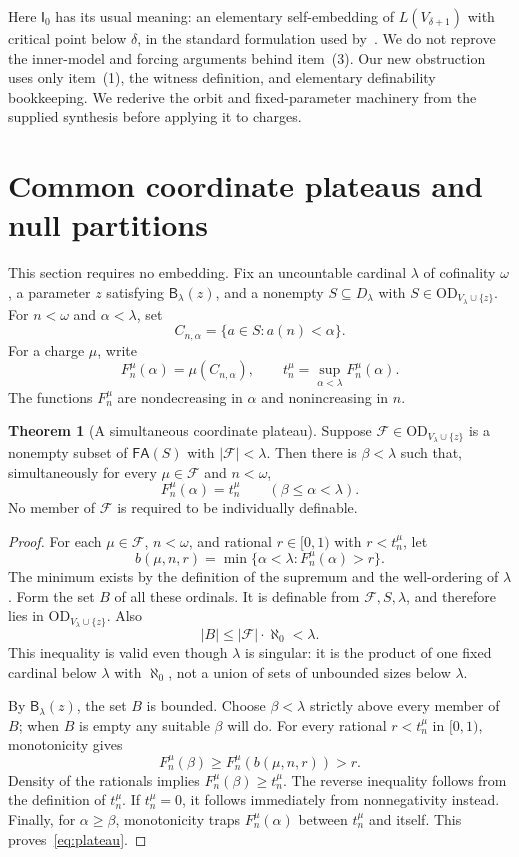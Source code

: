 \documentclass[11pt,letterpaper]{article}
\theoremstyle{definition}
\newtheorem{theorem}[definition]{Theorem}
\newcommand{\OD}{\mathrm{OD}}
\newcommand{\FA}{\mathsf{FA}}
\newcommand{\Izero}{\mathsf I_0}
\newcommand{\Blam}[1]{\mathsf B_\lambda(#1)}
\newcommand{\ODz}{\OD_{V_\lambda\cup\{z\}}}
\newcommand{\Dlam}{D_\lambda}
\begin{document}
Here $\Izero$ has its usual meaning: an elementary self-embedding of $L(V_{\delta+1})$ with critical point below $\delta$, in the standard formulation used by~\cite{abgl}. We do not reprove the inner-model and forcing arguments behind item~(3). Our new obstruction uses only item~(1), the witness definition, and elementary definability bookkeeping. We rederive the orbit and fixed-parameter machinery from the supplied synthesis before applying it to charges.

\section{Common coordinate plateaus and null partitions}\label{sec:null}

This section requires no embedding. Fix an uncountable cardinal $\lambda$ of cofinality $\omega$, a parameter $z$ satisfying $\Blam z$, and a nonempty $S\subseteq\Dlam$ with $S\in\ODz$. For $n<\omega$ and $\alpha<\lambda$, set
\[
 C_{n,\alpha}=\{a\in S:a(n)<\alpha\}.
\]
For a charge $\mu$, write
\[
 F_n^\mu(\alpha)=\mu(C_{n,\alpha}),
 \qquad t_n^\mu=\sup_{\alpha<\lambda}F_n^\mu(\alpha).
\]
The functions $F_n^\mu$ are nondecreasing in $\alpha$ and nonincreasing in $n$.

\begin{theorem}[A simultaneous coordinate plateau]\label{thm:plateau}
Suppose $\mathcal F\in\ODz$ is a nonempty subset of $\FA(S)$ with $|\mathcal F|<\lambda$. Then there is $\beta<\lambda$ such that, simultaneously for every $\mu\in\mathcal F$ and $n<\omega$,
\begin{equation}\label{eq:plateau}
 F_n^\mu(\alpha)=t_n^\mu\qquad(\beta\le\alpha<\lambda).
\end{equation}
No member of $\mathcal F$ is required to be individually definable.
\end{theorem}

\begin{proof}
For each $\mu\in\mathcal F$, $n<\omega$, and rational $r\in[0,1)$ with $r<t_n^\mu$, let
\[
 b(\mu,n,r)=\min\{\alpha<\lambda:F_n^\mu(\alpha)>r\}.
\]
The minimum exists by the definition of the supremum and the well-ordering of $\lambda$. Form the set $B$ of all these ordinals. It is definable from $\mathcal F,S,\lambda$, and therefore lies in $\ODz$. Also
\[
 |B|\le |\mathcal F|\cdot\aleph_0<\lambda.
\]
This inequality is valid even though $\lambda$ is singular: it is the product of one fixed cardinal below $\lambda$ with $\aleph_0$, not a union of sets of unbounded sizes below $\lambda$.

By $\Blam z$, the set $B$ is bounded. Choose $\beta<\lambda$ strictly above every member of $B$; when $B$ is empty any suitable $\beta$ will do. For every rational $r<t_n^\mu$ in $[0,1)$, monotonicity gives
\[
 F_n^\mu(\beta)\ge F_n^\mu(b(\mu,n,r))>r.
\]
Density of the rationals implies $F_n^\mu(\beta)\ge t_n^\mu$. The reverse inequality follows from the definition of $t_n^\mu$. If $t_n^\mu=0$, it follows immediately from nonnegativity instead. Finally, for $\alpha\ge\beta$, monotonicity traps $F_n^\mu(\alpha)$ between $t_n^\mu$ and itself. This proves~\eqref{eq:plateau}.
\end{proof}
\end{document}
